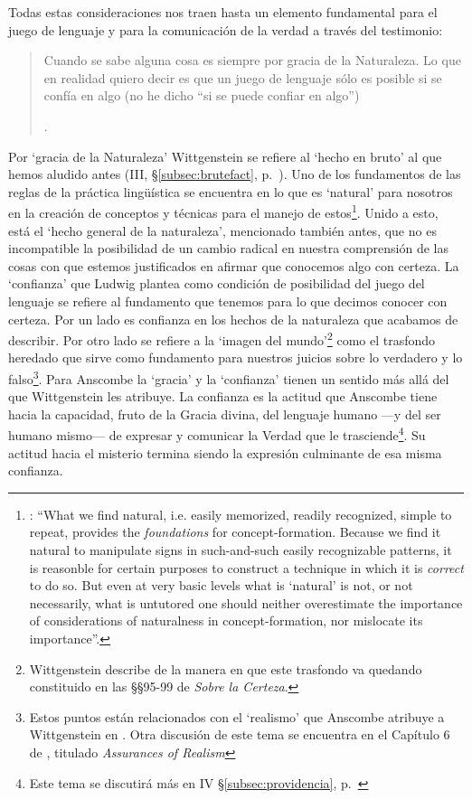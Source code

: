 Todas estas consideraciones nos traen hasta un elemento fundamental para el juego de lenguaje y para la comunicación de la verdad a través del testimonio: \blockquote[{\Cite[\S505; 509]{wittgenstein1969oncertes}}.]{Cuando se sabe alguna cosa es siempre por gracia de la Naturaleza. \textelp{} Lo que en realidad quiero decir es que un juego de lenguaje sólo es posible si se confía en algo (no he dicho ``si se puede confiar en algo'')}. Por `gracia de la Naturaleza' Wittgenstein se refiere al `hecho en bruto' al que hemos aludido antes (III, \S\ref{subsec:brutefact}, p.~\pageref{subsec:brutefact}). Uno de los fundamentos de las reglas de la práctica lingüística se encuentra en lo que es `natural' para nosotros en la creación de conceptos y técnicas para el manejo de estos\footnote{\Cite[Cf.][341]{bakerhacker2014rules}: \enquote{What we find natural, i.e. easily memorized, readily recognized, simple to repeat, provides the \emph{foundations} for concept-formation. Because we find it natural to manipulate signs in such-and-such easily recognizable patterns, it is reasonble for certain purposes to construct a technique in which it is \emph{correct} to do so. But even at very basic levels what is `natural' is not, or not necessarily, what is untutored \textelp{} one should neither overestimate the importance of considerations of naturalness in concept-formation, nor mislocate its importance}.}. Unido a esto, está el `hecho general de la naturaleza', mencionado también antes, que no es incompatible la posibilidad de un cambio radical en nuestra comprensión de las cosas con que estemos justificados en afirmar que conocemos algo con certeza. La `confianza' que Ludwig plantea como condición de posibilidad del juego del lenguaje se refiere al fundamento que tenemos para lo que decimos conocer con certeza. Por un lado es confianza en los hechos de la naturaleza que acabamos de describir. Por otro lado se refiere a la `imagen del mundo'\footnote{Wittgenstein describe de la manera en que este trasfondo va quedando constituido en las \S\S 95-99 de \emph{Sobre la Certeza}.} como el trasfondo heredado que sirve como fundamento para nuestros juicios sobre lo verdadero y lo falso\footnote{Estos puntos están relacionados con el `realismo' que Anscombe atribuye a Wittgenstein en \Cite{anscombe1981parmenides:qli}. Otra discusión de este tema se encuentra en el Capítulo 6 de \Cite[121-141]{kerr1997theo}, titulado \emph{Assurances of Realism}}.
Para Anscombe la `gracia' y la `confianza' tienen un sentido más allá del que Wittgenstein les atribuye. La confianza es la actitud que Anscombe tiene hacia la capacidad, fruto de la Gracia divina, del lenguaje humano ---y del ser humano mismo--- de expresar y comunicar la Verdad que le trasciende\footnote{Este tema se discutirá más en IV \S\ref{subsec:providencia}, p.~\pageref{subsec:providencia}}. Su actitud hacia el misterio termina siendo la expresión culminante de esa misma confianza. 

